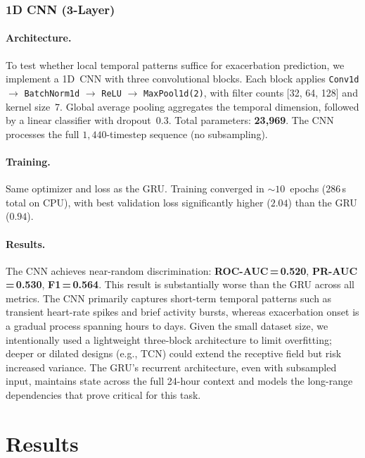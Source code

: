 \documentclass[11pt,a4paper]{article}
\begin{document}
\subsubsection{1D CNN (3-Layer)}\label{sec:cnn}

\paragraph{Architecture.}
To test whether local temporal patterns suffice for exacerbation prediction, we
implement a 1D~CNN with three convolutional blocks.  Each block applies
\texttt{Conv1d} $\to$ \texttt{BatchNorm1d} $\to$ \texttt{ReLU} $\to$
\texttt{MaxPool1d(2)}, with filter counts [32, 64, 128] and kernel size~7.
Global average pooling aggregates the temporal dimension, followed by a linear
classifier with dropout~0.3.  Total parameters: \textbf{23{,}969}.  The CNN
processes the full $1{,}440$-timestep sequence (no subsampling).

\paragraph{Training.}
Same optimizer and loss as the GRU.  Training converged in ${\sim}10$~epochs
(286\,s total on CPU), with best validation loss significantly higher ($2.04$)
than the GRU ($0.94$).

\paragraph{Results.}
The CNN achieves near-random discrimination: \textbf{ROC-AUC\,=\,0.520},
\textbf{PR-AUC\,=\,0.530}, \textbf{F1\,=\,0.564}.  This result is
substantially worse than the GRU across all metrics.  The CNN primarily
captures short-term temporal patterns such as transient heart-rate spikes
and brief activity bursts, whereas exacerbation onset is a gradual process
spanning hours to days.  Given the small dataset size, we intentionally used
a lightweight three-block architecture to limit overfitting; deeper or
dilated designs (e.g., TCN) could extend the receptive field but risk
increased variance.  The GRU's recurrent architecture, even with subsampled
input, maintains state across the full 24-hour context and models the
long-range dependencies that prove critical for this task.

\section{Results}\label{sec:results}
\end{document}
